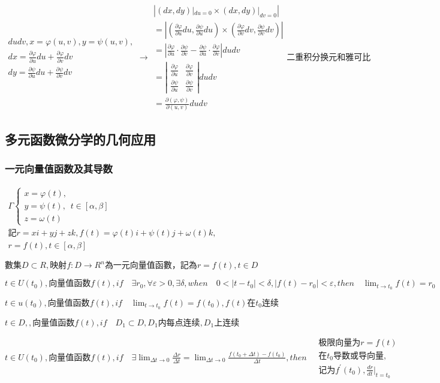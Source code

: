 \documentclass[UTF8]{ctexart}
\newcommand{\mt}[1]{\text{#1}}
\newcommand{\mf}[1]{\left( #1\right)}
\newcommand{\mfa}[1]{\left| #1\right|}
\newcommand{\mfc}[1]{\left[ #1 \right]}
\newcommand{\q}{\quad}
\newcommand{\qa}{\vspace{12 pt}}
\newcommand{\p}{\par}
\newcommand{\ma}[1]{\begin{array}{llll} #1 \end{array}}
\begin{document}
\qa

$\ma{
dudv,x=\varphi\mf{u,v},y=\psi\mf{u,v},\\
dx=\frac{\partial \varphi}{\partial u}du+\frac{\partial \varphi}{\partial v}dv\\
dy=\frac{\partial \psi}{\partial u}du+\frac{\partial \psi}{\partial v}dv
}  \rightarrow \ma{
\mfa{\mf{dx,dy}|_{du=0}\times\mf{dx,dy}|_{dv=0}}\\
=\mfa{\mf{\frac{\partial \varphi}{\partial u}du,\frac{\partial \psi}{\partial u}du}\times \mf{\frac{\partial \varphi}{\partial v}dv,\frac{\partial \psi}{\partial v}dv}}\\
=\mfa{\frac{\partial \varphi}{\partial u}\cdot\frac{\partial \psi}{\partial v}-  \frac{\partial \psi}{\partial u} \cdot \frac{\partial \varphi}{\partial v}  }dudv\\
=\mfa{\ma{
    \frac{\partial \varphi}{\partial u} & \frac{\partial \varphi}{\partial v}\\
    \frac{\partial \psi}{\partial u} & \frac{\partial \psi}{\partial v}
}}dudv\\
=\frac{\partial\mf{\varphi,\psi}}{\partial \mf{u,v}}dudv
} \mt{二重积分换元和雅可比}$




\subsection{多元函数微分学的几何应用}

\subsubsection{一元向量值函数及其导数}

$\ma{\Gamma \left\{\ma{x=\varphi\mf{t},\\y=\psi\mf{t},\\z=\omega\mf{t}}\right.t\in \mfc{\alpha,\beta}\\
    \mt{記}r=xi+yj+zk,f\mf{t}=\varphi\mf{t}i+\psi\mf{t}j+\omega\mf{t}k,\\
    r=f\mf{t},t\in \mfc{\alpha,\beta}

}$\p

$\mt{數集}D \subset R,\mt{映射} f:D\rightarrow R^n\mt{為一元向量值函數，記為}r=f\mf{t},t\in D$\p


$t \in U\mf{t_0},\mt{向量值函数}f\mf{t},if \q \exists r_0,\forall \varepsilon>0,\exists \delta,when \q 0<\mfa{t-t_0}<\delta,\mfa{f\mf{t}-r_0}<\varepsilon,then \q\lim_{t \rightarrow t_0}f\mf{t}=r_0$\p
$t \in u\mf{t_0},\mt{向量值函数}f\mf{t},if \q \lim_{t \rightarrow t_0}f\mf{t}=f\mf{t_0},f\mf{t}\mt{在}t_0\mt{连续}$\p
$t \in D,,\mt{向量值函数}f\mf{t},if \q D_1 \subset D,D_1\mt{内每点连续},D_1\mt{上连续}$\p
$t \in U\mf{t_0},\mt{向量值函数}f\mf{t},if \q \exists \lim_{\Delta t \rightarrow 0}\frac{\Delta r}{\Delta t}=\lim_{\Delta t \rightarrow 0}\frac{f\mf{t_0+\Delta t}-f\mf{t_0}}{\Delta t},then \q \ma{\mt{极限向量为}r=f\mf{t}\\\mt{在}t_0\mt{导数或导向量,}\\ \mt{记为}f^{'}\mf{t_0},\frac{dr}{dt}|_{t=t_0}}$\p
\end{document}
